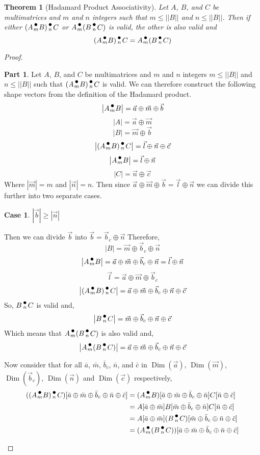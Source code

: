 \documentclass[12pt]{book}
\theoremstyle{plain}
\newtheorem{theorem}{Theorem}[chapter]
\theoremstyle{definition}
\theoremstyle{ppart}
\newtheorem{ppart}{Part}
\theoremstyle{case}
\newtheorem{case}{Case}
\theoremstyle{solution}
\DeclareMathOperator{\Dim}{Dim}
\newcommand{\dmult}[1]{\text{\raisebox{1ex}{$\underset{#1}{\,\bullet\,}$}}}
\newcommand{\shape}[1]{\left|#1\right|}
\begin{document}
\begin{theorem}[Hadamard Product Associativity]
Let $A$, $B$, and $C$ be multimatrices and $m$ and $n$ integers such that
$m \le \shape{\shape{B}}$ and $n \le \shape{\shape{B}}$.
Then if either $(A \dmult{m} B) \dmult{n} C$ or $A \dmult{m} (B \dmult{n} C)$ is valid,
the other is also valid and
\[ (A \dmult{m} B) \dmult{n} C = A \dmult{m} (B \dmult{n} C) \]
\end{theorem}
\begin{proof}
\begin{ppart}
Let $A$, $B$, and $C$ be multimatrices and $m$ and $n$ integers
$m \le \shape{\shape{B}}$ and $n \le \shape{\shape{B}}$ such that
$(A \dmult{m} B) \dmult{n} C$ is valid.
We can therefore construct the following shape vectors from the definition of the Hadamard product.
\[ \shape{A \dmult{m} B} = \vec{a} \oplus \vec{m} \oplus \vec{b} \]
\[ \shape{A} = \vec{a} \oplus \vec{m} \]
\[ \shape{B} = \vec{m} \oplus \vec{b} \]
\[ \shape{(A \dmult{m} B) \dmult{n} C} = \vec{l} \oplus \vec{n} \oplus \vec{c} \]
\[ \shape{A \dmult{m} B} = \vec{l} \oplus \vec{n} \]
\[ \shape{C} = \vec{n} \oplus \vec{c} \]
Where $\shape{\vec{m}} = m$ and $\shape{\vec{n}} = n$. 
Then since $\vec{a} \oplus \vec{m} \oplus \vec{b} = \vec{l} \oplus \vec{n}$ we can divide this further into two
separate cases.
\begin{case} $\shape{\vec{b}} \ge \shape{\vec{n}}$

Then we can divide $\vec{b}$ into $\vec{b} = \vec{b}_c \oplus \vec{n}$
Therefore,
\[ \shape{B} = \vec{m} \oplus \vec{b}_c \oplus \vec{n} \]
\[ \shape{A \dmult{m} B} = \vec{a} \oplus \vec{m} \oplus \vec{b}_c \oplus \vec{n} = \vec{l} \oplus \vec{n} \]
\[ \vec{l} = \vec{a} \oplus \vec{m} \oplus \vec{b}_c \]
\[ \shape{(A \dmult{m} B) \dmult{n} C} = \vec{a} \oplus \vec{m} \oplus \vec{b}_c \oplus \vec{n} \oplus \vec{c} \]
So, $B \dmult{n} C$ is valid and,
\[ \shape{B \dmult{n} C} = \vec{m} \oplus \vec{b}_c \oplus \vec{n} \oplus \vec{c} \]
Which means that $A \dmult{m} (B \dmult{n} C)$ is also valid and,
\[ \shape{A \dmult{m} (B \dmult{n} C)} = \vec{a} \oplus \vec{m} \oplus \vec{b}_c \oplus \vec{n} \oplus \vec{c} \]

Now consider that for all $\bar{a}$, $\bar{m}$, $\bar{b}_c$, $\bar{n}$, and $\bar{c}$ in
$\Dim(\vec{a})$, $\Dim(\vec{m})$, $\Dim(\vec{b}_c)$, $\Dim(\vec{n})$ and $\Dim(\vec{c})$ respectively,
\begin{align*}
  ((A \dmult{m} B) \dmult{n} C)[\bar{a} \oplus \bar{m} \oplus \bar{b}_c \oplus \bar{n} \oplus \bar{c}]
  &=
  (A \dmult{m} B)[\bar{a} \oplus \bar{m} \oplus \bar{b}_c \oplus \bar{n}]C[\bar{n} \oplus \bar{c}] \\
  &=
  A[\bar{a} \oplus \bar{m}]B[\bar{m} \oplus \bar{b}_c \oplus \bar{n}]C[\bar{n} \oplus \bar{c}] \\
  &=
  A[\bar{a} \oplus \bar{m}](B \dmult{n} C)[\bar{m} \oplus \bar{b}_c \oplus \bar{n} \oplus \bar{c}] \\
  &=
  (A \dmult{m} (B \dmult{n} C))[\bar{a} \oplus \bar{m} \oplus \bar{b}_c \oplus \bar{n} \oplus \bar{c}]
\end{align*}


\end{case}
\end{ppart}
\end{proof}
\end{document}
